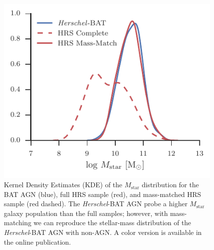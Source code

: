 \documentclass[fleqn, usenatbib]{mnras}
\newcommand{\herschel}{\emph{Herschel}}
\newcommand{\mstar}{$M_{\mathrm{star}}$}
\begin{document}
\begin{figure}
\includegraphics[width=\columnwidth]{figures/stellar_mass_comp_hrs_match}
\caption{Kernel Density Estimates (KDE) of the \mstar{} distribution for the BAT AGN (blue), full HRS sample (red), and mass-matched HRS sample (red dashed). The \herschel-BAT AGN probe a higher \mstar{} galaxy population than the full samples; however, with mass-matching we can reproduce the stellar-mass distribution of the \herschel-BAT AGN with non-AGN. A color version is available in the online publication. \label{fig:mstar_dist}}
\end{figure}
\end{document}

